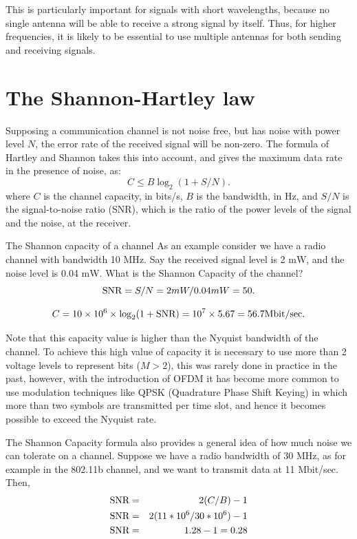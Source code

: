 This is particularly important for signals with short wavelengths, because no single
antenna will be able to receive a strong signal by itself. Thus, for higher frequencies,
it is likely to be essential to use multiple antennas for both sending and receiving signals.

\section{The Shannon-Hartley law}\label{shannonhartley}

Supposing a communication channel is not noise free, but has noise with power level $N$, the
error rate of the received signal will be non-zero. The formula of Hartley and
Shannon takes this into account, and gives the maximum data rate in the presence of noise,
as:
$$
C \leq B \log_{2} (1 + S/N). 
$$
where $C$ is the channel capacity, in bits/s, $B$ is the bandwidth, in Hz, and $S/N$ is the 
signal-to-noise ratio (SNR),
which is the ratio of the power levels of the signal and the noise, 
at the receiver. 

\begin{sbexample}{The Shannon capacity of a channel}%
As an example consider we have a radio channel with bandwidth 10
\textsc{MH}z. Say the received signal level is 2 m\textsc{W}, and the
noise level is 0.04 m\textsc{W}. What is the Shannon Capacity of the
channel?  
$$ 
\hbox{SNR} = S/N = 2mW / 0.04 mW = 50 .  
$$

$$
C = 10\times 10^{6} \times \log_{2}(1 + \hbox{SNR}) = 10^{7} \times 5.67 = 56.7 \hbox{Mbit/sec} .
$$
\end{sbexample}


Note that this capacity value is higher than the Nyquist bandwidth of
the channel. To achieve this high value of capacity it is necessary to
use more than 2 voltage levels to represent bits ($M > 2$), this was
rarely done in practice in the past, however, with the introduction of
OFDM it has become more common to use modulation techniques like QPSK
(Quadrature Phase Shift Keying) in which more than two symbols are transmitted per time slot,
and hence it becomes possible to exceed the Nyquist rate.

The Shannon Capacity formula also provides a general idea of how much noise we can 
tolerate on a channel. Suppose we have a radio bandwidth of 30 MHz, as for example in the
802.11b channel, and we want to transmit data at 11 Mbit/sec. Then,
\begin{eqnarray}\nonumber
\hbox{SNR} &=& 2(C/B)-1 \\
\nonumber
\hbox{SNR} &=& 2(11*10^{6}/30*10^{6})-1 \\
\nonumber
\hbox{SNR} &=& 1.28-1=0.28
\end{eqnarray}

